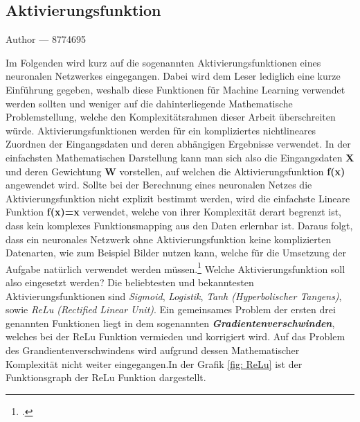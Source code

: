 \documentclass[12pt, a4paper]{report}
\makeatletter
\newcommand{\sectionauthor}[1]{%
  {\parindent0pt\vspace*{-5pt}%
  \large{Author --- }
  \linespread{1.1}\large\scshape#1%
  \par\nobreak\vspace*{35pt} }
  \@afterheading%
}
\makeatother
\begin{document}
\subsection{Aktivierungsfunktion}
\label{Aktivierungsfunktion}
\sectionauthor{8774695}
Im Folgenden wird kurz auf die sogenannten Aktivierungsfunktionen eines neuronalen Netzwerkes eingegangen.
Dabei wird dem Leser lediglich eine kurze Einführung gegeben, weshalb diese Funktionen für Machine Learning verwendet werden sollten und weniger auf die dahinterliegende Mathematische Problemstellung, welche den Komplexitätsrahmen dieser Arbeit überschreiten würde.
\newline
Aktivierungsfunktionen werden für ein kompliziertes nichtlineares Zuordnen der Eingangsdaten und deren abhängigen Ergebnisse verwendet. In der einfachsten Mathematischen Darstellung kann man sich also die Eingangsdaten \textbf{X} und deren Gewichtung \textbf{W} vorstellen, auf welchen die Aktivierungsfunktion \textbf{f(x)} angewendet wird. Sollte bei der Berechnung eines neuronalen Netzes die Aktivierungsfunktion nicht explizit bestimmt werden, wird die einfachste Lineare Funktion \textbf{f(x)=x} verwendet, welche von ihrer Komplexität derart begrenzt ist, dass kein komplexes Funktionsmapping aus den Daten erlernbar ist. Daraus folgt, dass ein neuronales Netzwerk ohne Aktivierungsfunktion keine komplizierten Datenarten, wie zum Beispiel Bilder nutzen kann, welche für die Umsetzung der Aufgabe natürlich verwendet werden müssen.\footcite[Vgl.][]{Aktivierungsfunktion}
\newline
Welche Aktivierungsfunktion soll also eingesetzt werden? Die beliebtesten und bekanntesten Aktivierungsfunktionen sind \textit{Sigmoid}, \textit{Logistik}, \textit{Tanh (Hyperbolischer Tangens)}, sowie \textit{ReLu (Rectified Linear Unit)}.
Ein gemeinsames Problem der ersten drei genannten Funktionen liegt in dem sogenannten \textit{\textbf{Gradientenverschwinden}}, welches bei der ReLu Funktion vermieden und korrigiert wird. Auf das Problem des Grandientenverschwindens wird aufgrund dessen Mathematischer Komplexität nicht weiter eingegangen.In der Grafik \ref{fig: ReLu} ist der Funktionsgraph der ReLu Funktion dargestellt.
\end{document}

